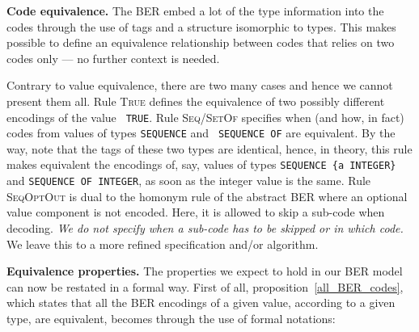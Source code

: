 \textbf{Code equivalence.} The BER embed a lot of the type information
into the codes through the use of tags and a structure isomorphic to
types. This makes possible to define an equivalence relationship
between codes that relies on two codes only --- no further context is
needed.
Contrary to value equivalence, there are two many cases and hence we
cannot present them all. Rule \textsc{True} defines the equivalence of
two possibly different encodings of the value \texttt{\small
TRUE}. Rule \textsc{Seq/SetOf} specifies when (and how, in fact) codes
from values of types \texttt{\small SEQUENCE} and \texttt{\small
SEQUENCE OF} are equivalent. By the way, note that the tags of these
two types are identical, hence, in theory, this rule makes equivalent
the encodings of, say, values of types \texttt{\small SEQUENCE \{a
INTEGER\}} and \texttt{\small SEQUENCE OF INTEGER}, as soon as the
integer value is the same. Rule \textsc{SeqOptOut} is dual to the
homonym rule of the abstract BER where an optional value component is
not encoded. Here, it is allowed to skip a sub-code when
decoding. \emph{We do not specify when a sub-code has to be skipped or
in which code.} We leave this to a more refined specification and/or
algorithm.

\medskip

\textbf{Equivalence properties.} The properties we expect to hold in
our BER model can now be restated in a formal way. First of all,
proposition~\ref{all_BER_codes}, which states that all the BER
encodings of a given value, according to a given type, are equivalent,
becomes through the use of formal notations:

